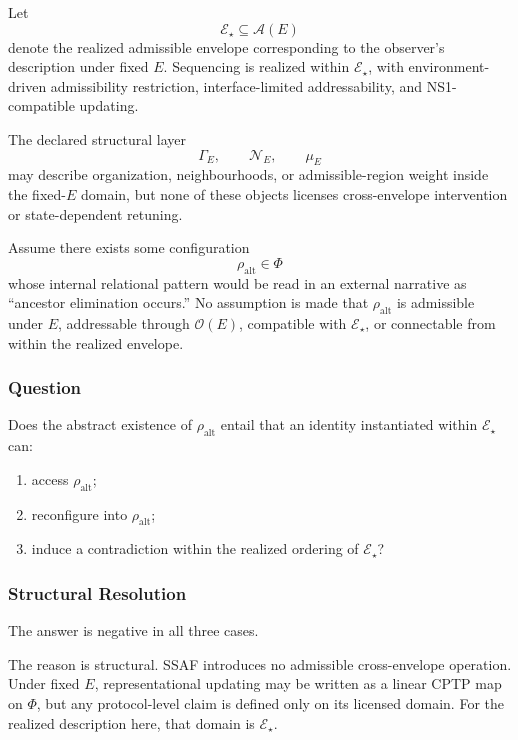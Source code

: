 \documentclass[aps,prx,onecolumn,11pt]{revtex4-2}
\theoremstyle{plain}
\theoremstyle{definition}
\theoremstyle{remark}
\begin{document}
Let
\[
\mathcal E_\star\subseteq\mathcal A(E)
\]
denote the realized admissible envelope corresponding to the observer's
description under fixed \(E\). Sequencing is realized within
\(\mathcal E_\star\), with environment-driven admissibility restriction,
interface-limited addressability, and NS1-compatible updating.

The declared structural layer
\[
\Gamma_E,
\qquad
\mathcal N_E,
\qquad
\mu_E
\]
may describe organization, neighbourhoods, or admissible-region weight
inside the fixed-\(E\) domain, but none of these objects licenses
cross-envelope intervention or state-dependent retuning.

Assume there exists some configuration
\[
\rho_{\mathrm{alt}}\in\Phi
\]
whose internal relational pattern would be read in an external narrative
as ``ancestor elimination occurs.'' No assumption is made that
\(\rho_{\mathrm{alt}}\) is admissible under \(E\), addressable through
\(\mathcal O(E)\), compatible with \(\mathcal E_\star\), or connectable
from within the realized envelope.

\subsubsection{Question}

Does the abstract existence of \(\rho_{\mathrm{alt}}\) entail that an
identity instantiated within \(\mathcal E_\star\) can:

\begin{enumerate}[label=(\roman*), leftmargin=2.2em]
\item access \(\rho_{\mathrm{alt}}\);
\item reconfigure into \(\rho_{\mathrm{alt}}\);
\item induce a contradiction within the realized ordering of
\(\mathcal E_\star\)?
\end{enumerate}

\subsubsection{Structural Resolution}

The answer is negative in all three cases.

The reason is structural. SSAF introduces no admissible cross-envelope
operation. Under fixed \(E\), representational updating may be written
as a linear CPTP map on \(\Phi\), but any protocol-level claim is
defined only on its licensed domain. For the realized description here,
that domain is \(\mathcal E_\star\).
\end{document}
